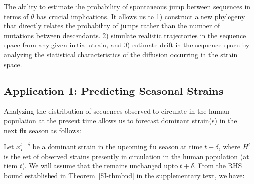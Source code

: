 {The ability to estimate the probability of spontaneous jump between sequences in terms of $\theta$ has  crucial implications. It allows us to 1) construct  a new  phylogeny that directly relates the probability of jumps rather than the number of mutations  between descendants. 2) simulate realistic trajectories in the sequence space from any given initial strain, and 3) estimate drift in the sequence space  by analyzing the statistical characteristics of the diffusion occurring in the strain space.





\subsection*{Application 1: Predicting Seasonal Strains}

Analyzing the distribution of sequences observed to circulate in the human population at the present time allows us to forecast dominant strain(s) in the next flu season as follows:




\def\E{\mathcal{E}}
\def\dst{x_\star^{t+\delta}}
\def\dsta{x^{t+\delta}}

Let $\dst$ be a dominant strain in the upcoming flu season at time $t+\delta$,
where $H^t$ is the set of observed strains presently in circulation in the human population (at tiem $t$). We will assume that the \enet  remains unchanged upto $t+\delta$.
From the RHS bound established in Theorem~\ref{SI-thmbnd} in the supplementary text, we have:

}
